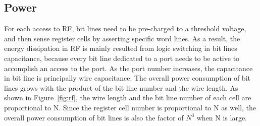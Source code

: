     \subsection{Power}
    For each access to RF, bit lines need to be pre-charged to a threshold voltage,
    and then sense register cells by asserting specific word lines.
    As a result, the energy dissipation in RF is mainly resulted from logic switching in bit lines capacitance,
    because every bit line dedicated to a port needs to be active to accomplish an access to the port.
    As the port number increases, the capacitance in bit line is principally wire capacitance.
    The overall power consumption of bit lines grows with the product of the bit line number and the wire length.
    As shown in Figure~\ref{fig:rf}, the wire length and the bit line number of each cell are proportional to N.
    Since the register cell number is proportional to N as well, 
    the overall power consumption of bit lines is also the factor of $N^3$ when N is large.
